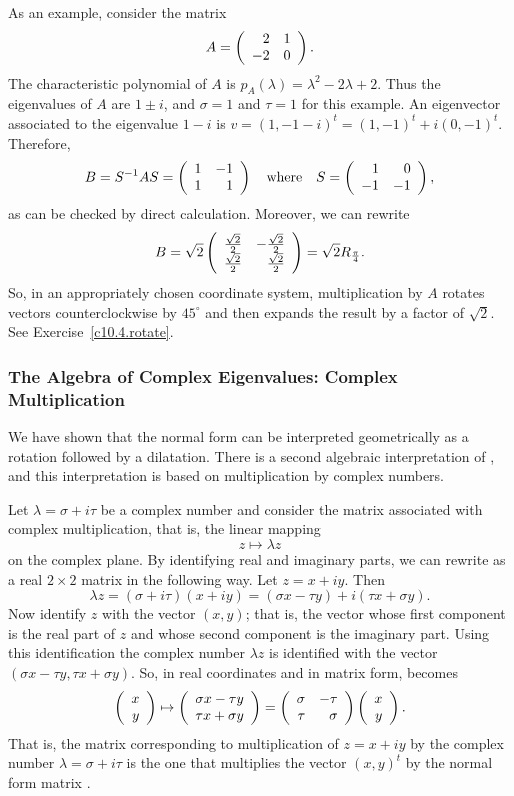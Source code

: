 \documentclass{ximera}
\begin{document}
As an example, consider the matrix
\begin{equation}  \label{E:exampA}
A = \left(\begin{array}{rr} 2 & 1\\ -2 &0\end{array}\right).
\end{equation}
The characteristic polynomial
of $A$ is $p_A(\lambda)=\lambda^2-2\lambda+2$.
Thus the eigenvalues of $A$ are $1\pm i$, and $\sigma=1$ and $\tau=1$ for
this example.  An eigenvector associated to the eigenvalue $1-i$ is 
$v=(1,-1-i)^t=(1,-1)^t+i(0,-1)^t$. Therefore, 
\[
B = S^{-1} A S = \left(\begin{array}{rr} 1 & -1\\ 1 &1\end{array}\right) \quad\mbox{where}\quad 
S = \left(\begin{array}{rr} 1 & 0\\ -1 &-1\end{array}\right),
\]
as can be checked by direct calculation.  Moreover, we can rewrite
\[
B = \sqrt{2}\left(\begin{array}{rr} \frac{\sqrt{2}}{2} & -\frac{\sqrt{2}}{2}\\ \frac{\sqrt{2}}{2} &\frac{\sqrt{2}}{2}\end{array}\right) =
\sqrt{2}R_{\frac{\pi}{4}}.
\]
So, in an appropriately chosen coordinate system, multiplication by $A$ rotates
vectors counterclockwise by $45^\circ$ and then expands the result by a 
factor of $\sqrt{2}$.  See Exercise~\ref{c10.4.rotate}.

\subsubsection*{The Algebra of Complex Eigenvalues: Complex Multiplication}

We have shown that the normal form  can 
be interpreted geometrically as a rotation followed by a dilatation.  There 
is a second algebraic interpretation of , and this 
interpretation is based on multiplication by complex numbers.

Let $\lambda=\sigma+i\tau$ be a complex number and consider the matrix 
associated with complex multiplication, that is, the linear mapping
\begin{equation}  \label{e:cplxmap}
z\mapsto \lambda z
\end{equation}
on the complex plane.  By identifying real and imaginary parts, we can 
rewrite  as a real $2\times 2$ matrix in the following way. 
Let $z=x + iy$.  Then
\[
\lambda z = (\sigma+i\tau)(x+iy) = (\sigma x - \tau y) + 
i(\tau x + \sigma y).
\]
Now identify $z$ with the vector $(x,y)$; that is, the vector whose first
component is the real part of $z$ and whose second component is the 
imaginary part.  Using this identification the complex number $\lambda z$
is identified with the vector $(\sigma x - \tau y,\tau x + \sigma y)$. 
So, in real coordinates and in matrix form,  becomes
\[
\left(\begin{array}{r} x \\ y\end{array}\right)\mapsto \left(\begin{array}{r} \sigma x - \tau y \\ \tau x + \sigma y\end{array}\right) =
\left(\begin{array}{rr} \sigma & -\tau\\ \tau &\sigma\end{array}\right) \left(\begin{array}{r} x \\ y\end{array}\right).
\]
That is, the matrix corresponding to multiplication of $z=x+iy$ by the 
complex number $\lambda=\sigma+i\tau$ is the one that multiplies the 
vector $(x,y)^t$ by the normal form matrix .
\end{document}

